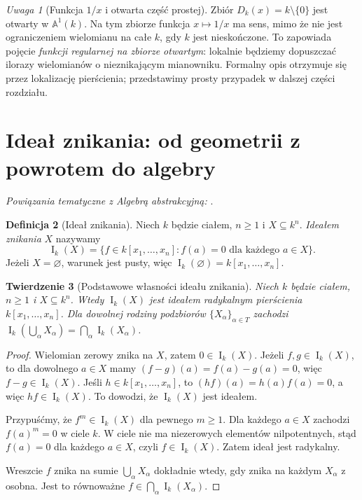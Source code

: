 \documentclass[11pt,a4paper,openany]{report}
\numberwithin{equation}{section}
\theoremstyle{plain}
\newtheorem{twierdzenie}{Twierdzenie}[section]
\theoremstyle{definition}
\newtheorem{definicja}[twierdzenie]{Definicja}
\theoremstyle{remark}
\newtheorem{uwaga}[twierdzenie]{Uwaga}
\newcommand{\A}{\mathbb A}
\newcommand{\I}{\operatorname I}
\begin{document}
\begin{uwaga}[Funkcja $1/x$ i otwarta część prostej]
Zbiór $D_k(x)=k\setminus\{0\}$ jest otwarty w $\A^1(k)$.
Na tym zbiorze funkcja $x\mapsto1/x$ ma sens, mimo że nie jest
ograniczeniem wielomianu na całe $k$, gdy $k$ jest nieskończone.
To zapowiada pojęcie \emph{funkcji regularnej na zbiorze otwartym}:
lokalnie będziemy dopuszczać ilorazy wielomianów o nieznikającym
mianowniku. Formalny opis otrzymuje się przez lokalizację pierścienia;
przedstawimy prosty przypadek w dalszej części rozdziału.
\end{uwaga}

\section{Ideał znikania: od geometrii z powrotem do algebry}

\noindent\emph{Powiązania tematyczne z Algebrą abstrakcyjną:} .


\begin{definicja}[Ideał znikania]
Niech $k$ będzie ciałem, $n\ge1$ i $X\subseteq k^n$.
\emph{Ideałem znikania} $X$ nazywamy
\[
\I_k(X)=\{f\in k[x_1,\dots,x_n]:f(a)=0\text{ dla każdego }a\in X\}.
\]
Jeżeli $X=\varnothing$, warunek jest pusty, więc
$\I_k(\varnothing)=k[x_1,\dots,x_n]$.
\end{definicja}

\begin{twierdzenie}[Podstawowe własności ideału znikania]
\label{tw:I-basic}
Niech $k$ będzie ciałem, $n\ge1$ i $X\subseteq k^n$.
Wtedy $\I_k(X)$ jest ideałem radykalnym pierścienia
$k[x_1,\dots,x_n]$. Dla dowolnej rodziny podzbiorów
$\{X_\alpha\}_{\alpha\in T}$ zachodzi
$\I_k(\bigcup_\alpha X_\alpha)=\bigcap_\alpha\I_k(X_\alpha)$.
\end{twierdzenie}
\begin{proof}
Wielomian zerowy znika na $X$, zatem $0\in\I_k(X)$.
Jeżeli $f,g\in\I_k(X)$, to dla dowolnego $a\in X$ mamy
$(f-g)(a)=f(a)-g(a)=0$, więc $f-g\in\I_k(X)$.
Jeśli $h\in k[x_1,\dots,x_n]$, to $(hf)(a)=h(a)f(a)=0$,
a więc $hf\in\I_k(X)$. To dowodzi, że $\I_k(X)$ jest ideałem.

Przypuśćmy, że $f^m\in\I_k(X)$ dla pewnego $m\ge1$.
Dla każdego $a\in X$ zachodzi $f(a)^m=0$ w ciele $k$.
W ciele nie ma niezerowych elementów nilpotentnych, stąd
$f(a)=0$ dla każdego $a\in X$, czyli $f\in\I_k(X)$.
Zatem ideał jest radykalny.

Wreszcie $f$ znika na sumie $\bigcup_\alpha X_\alpha$
dokładnie wtedy, gdy znika na każdym $X_\alpha$ z osobna.
Jest to równoważne $f\in\bigcap_\alpha\I_k(X_\alpha)$.
\end{proof}
\end{document}
